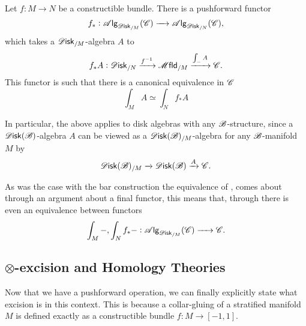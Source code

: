 \documentclass[../text]{subfiles}
\begin{document}
\begin{theorem}\label{thm:fh_pushforward}
    Let $f: M \xrightarrow{} N$ be a constructible bundle. There is a pushforward functor
    \begin{equation}
        f_*: \alg{\disk_{/M}}(\catC) \xrightarrow{\quad} \alg{\disk_{/N}}(\catC),
    \end{equation}
    which takes a $\disk_{/M}$-algebra $A$ to
    \begin{equation}
        f_*A: \disk_{/N} \xrightarrow{f^{-1}} \mfld_{/M} \xrightarrow{\int_{-} A} \catC.
    \end{equation}
    This functor is such that there is a canonical equivalence in $\mathscr{C}$
    \begin{equation}
        \int_{M} A \simeq \int_{N} f_* A
    \end{equation}
\end{theorem}


\begin{remark}
    In particular, the above applies to disk algebras with any $\mathscr{B}$-structure, since a $\disk(\bstr)$-algebra $A$ can be viewed as a $\disk(\bstr)_{/M}$-algebra for any $\mathscr{B}$-manifold $M$ by
    \begin{equation}
        \disk(\bstr)_{/M} \xrightarrow{} \disk(\bstr) \xrightarrow{A} \catC.
    \end{equation}
\end{remark}

\begin{remark}\label{rem:fh_pushforward_functorial}
    As was the case with the bar construction the equivalence of , comes about through an argument about a final functor, this means that, through  there is even an equivalence between functors
    \begin{equation}
        \int_M -, \int_N f_* - : \alg{\disk_{/M}} (\catC) \xrightarrow{\ \ \ \ } \catC.
    \end{equation}
\end{remark}




\subsection{\texorpdfstring{$\otimes$}{tensor}-excision and Homology Theories}

Now that we have a pushforward operation, we can finally explicitly state what excision is in this context. This is because a collar-gluing of a stratified manifold $M$ is defined exactly as a constructible bundle $f: M \xrightarrow{} [-1,1]$.
\end{document}
